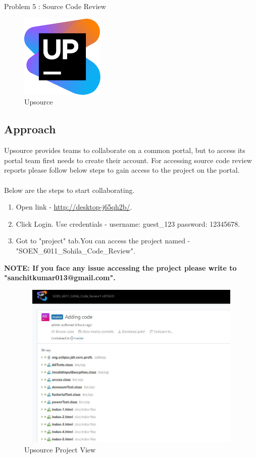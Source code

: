\documentclass[a4paper,12pt]{article}
\begin{document}
\begin{section}{Problem 5 : Source Code Review}
\begin{figure}[htp]
	\centering
	\includegraphics[width=4cm]{Upsource_logo.jpg}
	\caption{Upsource}
	\label{fig:galaxy}
\end{figure}


\end{section}


\vspace{3cm}

\subsection{Approach}
Upsource provides teams to collaborate on a common portal, but to access its portal team first needs to create their account. For accessing source code review reports please follow below steps to gain access to the project on the portal.
\\ \\
Below are the steps to start collaborating. 

\begin{enumerate}
	\item Open link - \url{http://desktop-j65qh2b/}.
	\item Click Login. Use credentials - username: guest\_123 password: 12345678.
	\item Got to "project" tab.You can access the project named - "SOEN\_6011\_Sohila\_Code\_Review".
\end{enumerate}
\vspace{5mm}
\textbf{\Large{NOTE: If you face any issue accessing the project please write to "sanchitkumar013@gmail.com".}}

\begin{figure}[htp]
	\centering
	\includegraphics[width=12cm,height=8cm,keepaspectratio]{Project_View.jpg}
	\caption{Upsource Project View}
	\label{fig:galaxy}
\end{figure}
\end{document}
